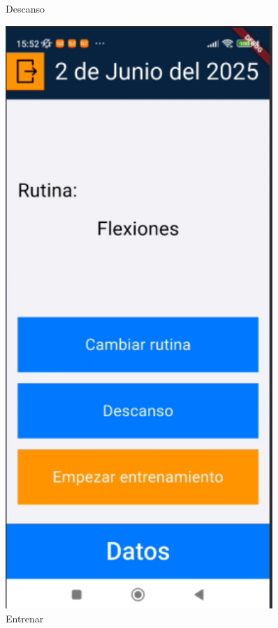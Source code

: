 \begin{figure}[H]
\begin{minipage}{0.4\textwidth}
      \caption{Descanso}
      \label{fig:Descanso}
   \end{minipage}%
   \hspace{0.5cm}
   \begin{minipage}{0.4\textwidth}
      \centering
      \includegraphics[width=0.9\textwidth]{pantallas/entrenar.png}
      \caption{Entrenar}
      \label{fig:Entrenar}
   \end{minipage}
\end{figure}


